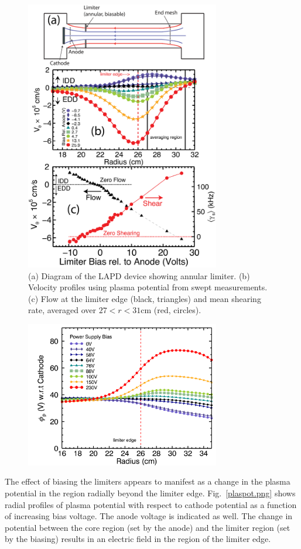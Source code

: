 \documentclass[aip,pop,amsmath,amssymb,preprint,superscriptaddress]{revtex4-1} %
\begin{document}
\begin{figure}[!htbp]
\centerline{
\includegraphics[width=8.5cm]{figure1.eps}}
\caption{\label{fig:velocity_flowshear} (a) Diagram of the LAPD device showing annular limiter.  (b) Velocity profiles using plasma potential from swept measurements. (c) Flow at the limiter edge (black, triangles) and mean shearing rate, averaged over $27 < r < 31$cm (red, circles).}
\end{figure}

\begin{figure}[!htbp]
\centerline{
\includegraphics[width=8.5cm]{plaspot.png}}
\caption{\label{fig:velocity_flowshear}}
\end{figure}


The effect of biasing the limiters appears to manifest as a change in the plasma potential in the region radially beyond the limiter edge. Fig.~\ref{plaspot.png} shows radial profiles of plasma potential with respect to cathode potential as a function of increasing bias voltage. The anode voltage is indicated as well. The change in potential between the core region (set by the anode) and the limiter region (set by the biasing) results in an electric field in the region of the limiter edge. 
\end{document}

